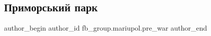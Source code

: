  
 
 
 
 

\subsection{Приморський парк}
\label{sec:10_02_2023.fb.fb_group.mariupol.pre_war.2.primorskii_park}

\ifcmt
 author_begin
   author_id fb_group.mariupol.pre_war
 author_end
\fi

